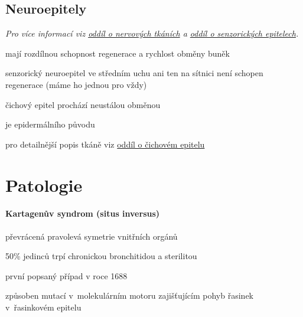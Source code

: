 \documentclass[DIV=8]{scrreprt}
\begin{document}
\subsection{Neuroepitely} \label{Neuroepitely}


\emph{Pro více informací viz \hyperref[Nervové buňky]{oddíl o nervových tkáních} a \hyperref[Senzorické epitely]{oddíl o senzorických epitelech}.}

\begin{myItemize}[nosep]
    \item mají rozdílnou schopnost regenerace a rychlost obměny buněk
\begin{myItemize}[nosep]
    \item senzorický neuroepitel ve středním uchu ani ten na sítnici není schopen regenerace (máme ho jednou pro vždy)
    \item čichový epitel prochází neustálou obměnou
\begin{myItemize}[nosep]
    \item je epidermálního původu
    \item pro detailnější popis tkáně viz \hyperref[Čichový epitel]{oddíl o čichovém epitelu}
\end{myItemize}

\end{myItemize}

\end{myItemize}



\section{Patologie} \label{Patologie} \FloatBarrier


\paragraph{Kartagenův syndrom (situs inversus)}
\begin{myItemize}[nosep]
    \item převrácená pravolevá symetrie vnitřních orgánů
    \item 50\% jedinců trpí chronickou bronchitidou a sterilitou
    \item první popsaný případ v roce 1688
    \item způsoben mutací v molekulárním motoru zajišťujícím pohyb řasinek v řasinkovém epitelu
\end{myItemize}
\end{document}
